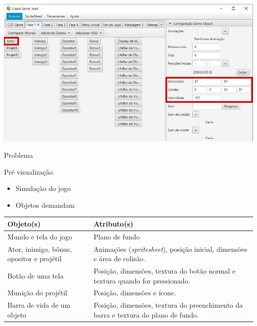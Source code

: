 \documentclass{beamer}
\begin{document}
   \begin{frame}
      \includegraphics[width=\textwidth]{images/obj_dimensoes.jpg}
   \end{frame}

   \begin{frame}{Problema}
      \begin{block}{Pré visualização}
         \begin{itemize}
            \item<+-> Simulação do jogo
            \item<+-> Objetos demandam
         \end{itemize}
      \end{block}
   \end{frame}

   \begin{frame}
      \begin{center}
         \begin{tabular}{p{12em} | p{12em}}
            \textbf{Objeto(s)} & \textbf{Atributo(s)} \\
            \hline
            Mundo e tela do jogo & Plano de fundo \\
            \hline
            Ator, inimigo, bônus, opositor e projétil & Animações (\emph{spritesheet}), posição inicial, dimensões e área de colisão. \\
            \hline
            Botão de uma tela & Posição, dimensões, textura do botão normal e textura quando for pressionado.\\
            \hline
            Munição do projétil & Posição, dimensões e ícone. \\
            \hline
            Barra de vida de um objeto & Posição, dimensões, textura do preenchimento da barra e textura do plano de fundo. \\
         \end{tabular}
      \end{center}
   \end{frame}
\end{document}
